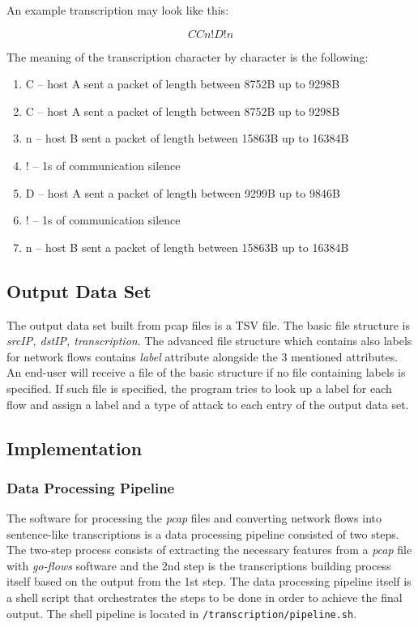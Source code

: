 \documentclass{article}
\begin{document}
An example transcription may look like this:

$$ CCn!D!n $$

The meaning of the transcription character by character is the following:

\begin{enumerate}
    \item C -- host A sent a packet of length between 8752B up to 9298B
    \item C -- host A sent a packet of length between 8752B up to 9298B
    \item n -- host B sent a packet of length between 15863B up to 16384B
    \item ! -- 1s of communication silence
    \item D -- host A sent a packet of length between 9299B up to 9846B
    \item ! -- 1s of communication silence
    \item n -- host B sent a packet of length between 15863B up to 16384B
\end{enumerate}


\subsection{Output Data Set}

The output data set built from pcap files is a TSV file. The basic file structure is \textit{srcIP, dstIP, transcription}. The advanced file structure which contains also labels for network flows contains \textit{label} attribute alongside the 3 mentioned attributes. An end-user will receive a file of the basic structure if no file containing labels is specified. If such file is specified, the program tries to look up a label for each flow and assign a label and a type of attack to each entry of the output data set.



\subsection{Implementation}

\subsubsection{Data Processing Pipeline}
The software for processing the \textit{pcap} files and converting network flows into sentence-like transcriptions is a data processing pipeline consisted of two steps. The two-step process consists of extracting the necessary features from a \textit{pcap} file with \textit{go-flows} software \cite{goflows-reference} and the 2nd step is the transcriptions building process itself based on the output from the 1st step. The data processing pipeline itself is a shell script that orchestrates the steps to be done in order to achieve the final output. The shell pipeline is located in \verb|/transcription/pipeline.sh|.
\end{document}
